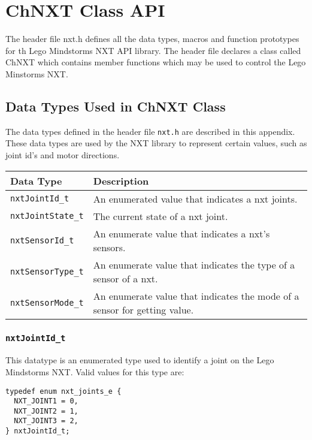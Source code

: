 \section{\label{sec:chnxt_api}ChNXT Class API}
The header file nxt.h defines all the data types, macros and 
function prototypes for th Lego Mindstorms NXT API library. 
The header file declares a class called ChNXT which contains
member functions which may be used to control the Lego
Minstorms NXT.\\
\subsection{\label{sec:datatypes}Data Types Used in ChNXT Class}
The data types defined in the header file \texttt{nxt.h} are 
described in this appendix. These data types are used by the NXT 
library to represent certain values, such as joint id's and motor 
directions.\\

\noindent
\begin{tabular}{p{3.5cm}p{12cm}} 
\hline 
Data Type& Description \\
\hline 
\texttt{nxtJointId\_t} & An enumerated value that indicates a 
nxt joints. \\
\texttt{nxtJointState\_t} & The current state of a nxt joint. \\
\texttt{nxtSensorId\_t} & An enumerate value that indicates a 
nxt's sensors. \\
\texttt{nxtSensorType\_t} & An enumerate value that indicates 
the type of a sensor of a nxt.\\
\texttt{nxtSensorMode\_t} & An enumerate value that indicates 
the mode of a sensor for getting value. \\
\hline
\end{tabular}

\subsubsection{\label{sec:nxtJointId_t}\texttt{nxtJointId\_t}}
This datatype is an enumerated type used to identify a joint on 
the Lego Mindstorms NXT. Valid values for this type are:
\begin{verbatim}
typedef enum nxt_joints_e {
  NXT_JOINT1 = 0,
  NXT_JOINT2 = 1,
  NXT_JOINT3 = 2,
} nxtJointId_t;
\end{verbatim}


